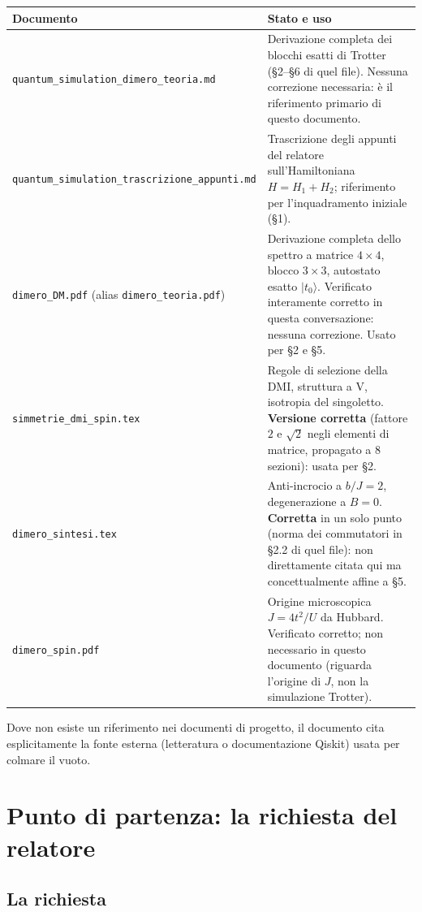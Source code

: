 \documentclass[11pt,a4paper]{article}
\begin{document}
\begin{center}
\begin{tabular}{@{}p{4.6cm}p{9.6cm}@{}}
\toprule
Documento & Stato e uso \\
\midrule
\texttt{quantum\_simulation\_dimero\_teoria.md} & Derivazione completa dei blocchi
esatti di Trotter (\S2--\S6 di quel file). Nessuna correzione necessaria: è
il riferimento primario di questo documento. \\
\texttt{quantum\_simulation\_trascrizione\_appunti.md} & Trascrizione degli
appunti del relatore sull'Hamiltoniana $H=H_1+H_2$; riferimento per
l'inquadramento iniziale (\S1). \\
\texttt{dimero\_DM.pdf} (alias \texttt{dimero\_teoria.pdf}) & Derivazione
completa dello spettro a matrice $4\times4$, blocco $3\times3$, autostato
esatto $|t_0\rangle$. Verificato interamente corretto in questa
conversazione: nessuna correzione. Usato per \S2 e \S5. \\
\texttt{simmetrie\_dmi\_spin.tex} & Regole di selezione della DMI, struttura
a V, isotropia del singoletto. \textbf{Versione corretta} (fattore $2$ e
$\sqrt2$ negli elementi di matrice, propagato a 8 sezioni): usata per \S2. \\
\texttt{dimero\_sintesi.tex} & Anti-incrocio a $b/J=2$, degenerazione a
$B=0$. \textbf{Corretta} in un solo punto (norma dei commutatori in \S2.2 di
quel file): non direttamente citata qui ma concettualmente affine a \S5. \\
\texttt{dimero\_spin.pdf} & Origine microscopica $J=4t^2/U$ da Hubbard.
Verificato corretto; non necessario in questo documento (riguarda l'origine
di $J$, non la simulazione Trotter). \\
\bottomrule
\end{tabular}
\end{center}

Dove non esiste un riferimento nei documenti di progetto, il documento cita
esplicitamente la fonte esterna (letteratura o documentazione Qiskit) usata
per colmare il vuoto.

\section{Punto di partenza: la richiesta del relatore}

\subsection{La richiesta}
\end{document}
